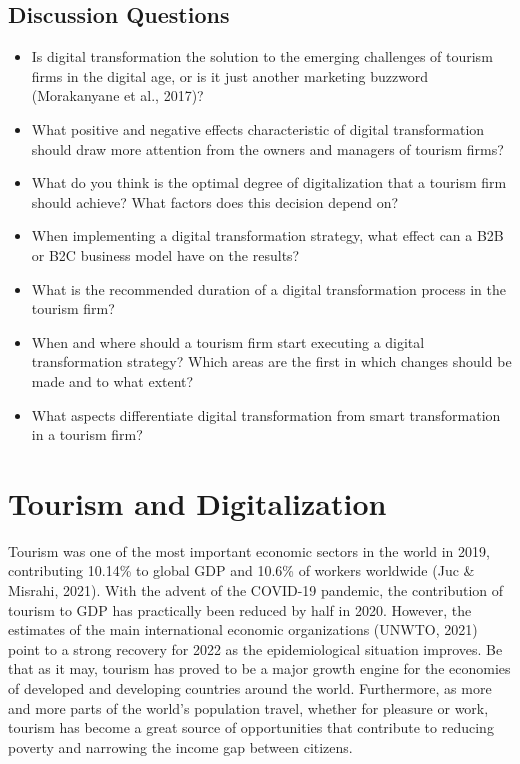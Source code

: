 \documentclass[
  letterpaper,
  DIV=11,
  numbers=noendperiod]{scrreprt}
\begin{document}
\hypertarget{discussion-questions-1}{%
\section{Discussion Questions}\label{discussion-questions-1}}

\begin{itemize}
\item
  Is digital transformation the solution to the emerging challenges of
  tourism firms in the digital age, or is it just another marketing
  buzzword (Morakanyane et al., 2017)?
\item
  What positive and negative effects characteristic of digital
  transformation should draw more attention from the owners and managers
  of tourism firms?
\item
  What do you think is the optimal degree of digitalization that a
  tourism firm should achieve? What factors does this decision depend
  on?
\item
  When implementing a digital transformation strategy, what effect can a
  B2B or B2C business model have on the results?
\item
  What is the recommended duration of a digital transformation process
  in the tourism firm?
\item
  When and where should a tourism firm start executing a digital
  transformation strategy? Which areas are the first in which changes
  should be made and to what extent?
\item
  What aspects differentiate digital transformation from smart
  transformation in a tourism firm?
\end{itemize}

\hypertarget{tourism-and-digitalization}{%
\chapter{Tourism and Digitalization}\label{tourism-and-digitalization}}

Tourism was one of the most important economic sectors in the world in
2019, contributing 10.14\% to global GDP and 10.6\% of workers worldwide
(Juc \& Misrahi, 2021). With the advent of the COVID-19 pandemic, the
contribution of tourism to GDP has practically been reduced by half in
2020. However, the estimates of the main international economic
organizations (UNWTO, 2021) point to a strong recovery for 2022 as the
epidemiological situation improves. Be that as it may, tourism has
proved to be a major growth engine for the economies of developed and
developing countries around the world. Furthermore, as more and more
parts of the world's population travel, whether for pleasure or work,
tourism has become a great source of opportunities that contribute to
reducing poverty and narrowing the income gap between citizens.
\end{document}
